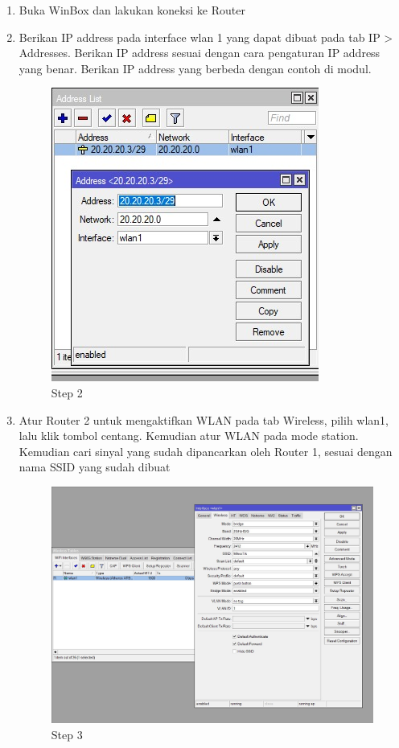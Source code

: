 \begin{enumerate}
	\item Buka WinBox dan lakukan koneksi ke Router

	\item Berikan IP address pada interface wlan 1 yang dapat dibuat pada tab IP > Addresses. Berikan
	IP address sesuai dengan cara pengaturan IP address yang benar. Berikan IP address yang
	berbeda dengan contoh di modul.
	\begin{figure}[H]
		\centering
		\includegraphics[width=0.5\linewidth]{P1/img/per1pc2step2.jpg}
		\caption{Step 2}
		\label{fig:gambar6}
	\end{figure}

	\item Atur Router 2 untuk mengaktifkan WLAN pada tab Wireless, pilih wlan1, lalu klik tombol centang.
	Kemudian atur WLAN pada mode station. Kemudian cari sinyal yang sudah dipancarkan oleh
	Router 1, sesuai dengan nama SSID yang sudah dibuat
	\begin{figure}[H]
		\centering
		\includegraphics[width=0.5\linewidth]{P1/img/per1pc2step3.jpg}
		\caption{Step 3}
		\label{fig:gambar7}
	\end{figure}

\end{enumerate}

